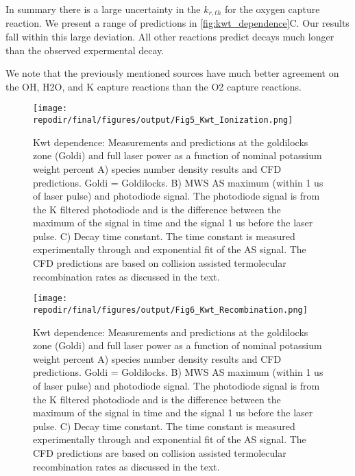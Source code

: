In summary there is a large uncertainty in the $k_{r,th}$ for the oxygen capture reaction. We present a range of predictions in \ref{fig:kwt_dependence}C. Our results fall within this large deviation. All other reactions predict decays much longer than the observed expermental decay. 

We note that the previously mentioned sources have much better agreement on the OH, H2O, and K capture reactions than the O2 capture reactions. 



\begin{figure}[h]
    \texttt{[image: \\repodir/final/figures/output/Fig5\_Kwt\_Ionization.png]} 
    \caption{Kwt dependence: Measurements and predictions at the goldilocks zone (Goldi) and full laser power as a function of nominal potassium weight percent A) species number density results and CFD predictions. Goldi = Goldilocks. B) MWS AS maximum (within 1 us of laser pulse) and photodiode signal. The photodiode signal is from the K filtered photodiode and is the difference between the maximum of the signal in time and the signal 1 us before the laser pulse. C) Decay time constant. The time constant is measured experimentally through and exponential fit of the AS signal. The CFD predictions are based on collision assisted termolecular recombination rates as discussed in the text. }
    \label{fig:kwt_ionization}
\end{figure}


\begin{figure}[h]
    \texttt{[image: \\repodir/final/figures/output/Fig6\_Kwt\_Recombination.png]} 
    \caption{Kwt dependence: Measurements and predictions at the goldilocks zone (Goldi) and full laser power as a function of nominal potassium weight percent A) species number density results and CFD predictions. Goldi = Goldilocks. B) MWS AS maximum (within 1 us of laser pulse) and photodiode signal. The photodiode signal is from the K filtered photodiode and is the difference between the maximum of the signal in time and the signal 1 us before the laser pulse. C) Decay time constant. The time constant is measured experimentally through and exponential fit of the AS signal. The CFD predictions are based on collision assisted termolecular recombination rates as discussed in the text. }
    \label{fig:kwt_recombination}
\end{figure}


